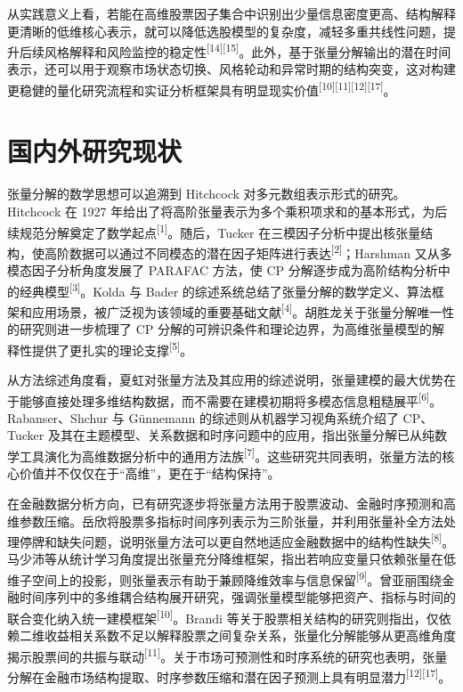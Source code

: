 从实践意义上看，若能在高维股票因子集合中识别出少量信息密度更高、结构解释更清晰的低维核心表示，就可以降低选股模型的复杂度，减轻多重共线性问题，提升后续风格解释和风险监控的稳定性\textsuperscript{[14][15]}。此外，基于张量分解输出的潜在时间表示，还可以用于观察市场状态切换、风格轮动和异常时期的结构突变，这对构建更稳健的量化研究流程和实证分析框架具有明显现实价值\textsuperscript{[10][11][12][17]}。

\section{国内外研究现状}

张量分解的数学思想可以追溯到 Hitchcock 对多元数组表示形式的研究。Hitchcock 在 1927 年给出了将高阶张量表示为多个乘积项求和的基本形式，为后续规范分解奠定了数学起点\textsuperscript{[1]}。随后，Tucker 在三模因子分析中提出核张量结构，使高阶数据可以通过不同模态的潜在因子矩阵进行表达\textsuperscript{[2]}；Harshman 又从多模态因子分析角度发展了 PARAFAC 方法，使 CP 分解逐步成为高阶结构分析中的经典模型\textsuperscript{[3]}。Kolda 与 Bader 的综述系统总结了张量分解的数学定义、算法框架和应用场景，被广泛视为该领域的重要基础文献\textsuperscript{[4]}。胡胜龙关于张量分解唯一性的研究则进一步梳理了 CP 分解的可辨识条件和理论边界，为高维张量模型的解释性提供了更扎实的理论支撑\textsuperscript{[5]}。

从方法综述角度看，夏虹对张量方法及其应用的综述说明，张量建模的最大优势在于能够直接处理多维结构数据，而不需要在建模初期将多模态信息粗糙展平\textsuperscript{[6]}。Rabanser、Shchur 与 Günnemann 的综述则从机器学习视角系统介绍了 CP、Tucker 及其在主题模型、关系数据和时序问题中的应用，指出张量分解已从纯数学工具演化为高维数据分析中的通用方法族\textsuperscript{[7]}。这些研究共同表明，张量方法的核心价值并不仅仅在于“高维”，更在于“结构保持”。

在金融数据分析方向，已有研究逐步将张量方法用于股票波动、金融时序预测和高维参数压缩。岳欣将股票多指标时间序列表示为三阶张量，并利用张量补全方法处理停牌和缺失问题，说明张量方法可以更自然地适应金融数据中的结构性缺失\textsuperscript{[8]}。马少沛等从统计学习角度提出张量充分降维框架，指出若响应变量只依赖张量在低维子空间上的投影，则张量表示有助于兼顾降维效率与信息保留\textsuperscript{[9]}。曾亚丽围绕金融时间序列中的多维耦合结构展开研究，强调张量模型能够把资产、指标与时间的联合变化纳入统一建模框架\textsuperscript{[10]}。Brandi 等关于股票相关结构的研究则指出，仅依赖二维收益相关系数不足以解释股票之间复杂关系，张量化分解能够从更高维角度揭示股票间的共振与联动\textsuperscript{[11]}。关于市场可预测性和时序系统的研究也表明，张量分解在金融市场结构提取、时序参数压缩和潜在因子预测上具有明显潜力\textsuperscript{[12][17]}。

